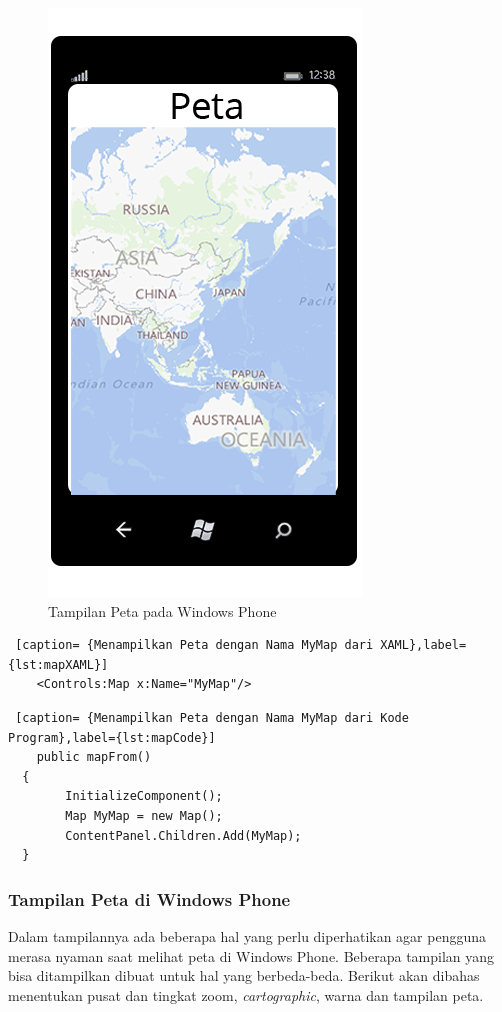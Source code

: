 \begin{figure}[h]
	\centering
		\includegraphics[scale=0.1]{Gambar/map}
	\caption{Tampilan Peta pada Windows Phone}
	\label{fig:peta}
\end{figure}

\begin{lstlisting} [caption= {Menampilkan Peta dengan Nama MyMap dari XAML},label={lst:mapXAML}]
	<Controls:Map x:Name="MyMap"/>
\end{lstlisting}

\begin{lstlisting} [caption= {Menampilkan Peta dengan Nama MyMap dari Kode Program},label={lst:mapCode}]
	public mapFrom()
  {
		InitializeComponent();
		Map MyMap = new Map();
		ContentPanel.Children.Add(MyMap);
  }
\end{lstlisting}

\subsubsection{Tampilan Peta di Windows Phone}
\label{subsubsec:Tampilan Peta di Windows Phone}
\hspace{0.5cm} Dalam tampilannya ada beberapa hal yang perlu diperhatikan agar pengguna merasa nyaman saat melihat peta di Windows Phone. Beberapa tampilan yang bisa ditampilkan dibuat untuk hal yang berbeda-beda. Berikut akan dibahas menentukan pusat dan tingkat zoom, \textit{cartographic}, warna dan tampilan peta.

